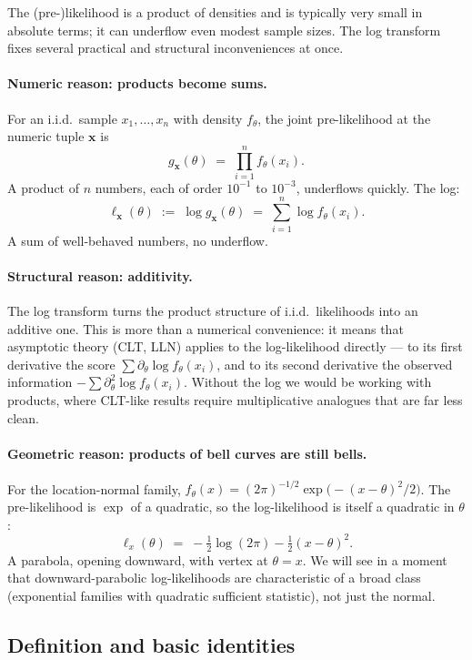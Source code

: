 \documentclass[a4paper,oneside,12pt]{extarticle}
\theoremstyle{plain}
\theoremstyle{definition}
\theoremstyle{remark}
\begin{document}
The (pre-)likelihood is a product of densities and is typically very
small in absolute terms; it can underflow even modest sample sizes.
The log transform fixes several practical and structural
inconveniences at once.

\paragraph{Numeric reason: products become sums.}
For an i.i.d.\ sample $x_1,\ldots,x_n$ with density $f_\theta$,
the joint pre-likelihood at the numeric tuple $\mathbf{x}$ is
\[
  g_{\mathbf{x}}(\theta) \;=\; \prod_{i=1}^n f_\theta(x_i).
\]
A product of $n$ numbers, each of order $10^{-1}$ to $10^{-3}$,
underflows quickly.  The log:
\[
  \ell_{\mathbf{x}}(\theta) \;:=\; \log g_{\mathbf{x}}(\theta)
  \;=\; \sum_{i=1}^n \log f_\theta(x_i).
\]
A sum of well-behaved numbers, no underflow.

\paragraph{Structural reason: additivity.}
The log transform turns the product structure of i.i.d.\ likelihoods
into an additive one.  This is more than a numerical convenience: it
means that asymptotic theory (CLT, LLN) applies to the log-likelihood
directly --- to its first derivative the score
$\sum \partial_\theta \log f_\theta(x_i)$, and to its second derivative
the observed information $-\sum \partial^2_\theta \log f_\theta(x_i)$.
Without the log we would be working with products, where CLT-like
results require multiplicative analogues that are far less clean.

\paragraph{Geometric reason: products of bell curves are still bells.}
For the location-normal family, $f_\theta(x) = (2\pi)^{-1/2}
\exp\!\bigl(-(x-\theta)^2/2\bigr)$.  The pre-likelihood is
$\exp$ of a quadratic, so the log-likelihood is itself a quadratic
in $\theta$:
\[
  \ell_x(\theta) \;=\; -\tfrac{1}{2}\log(2\pi) - \tfrac{1}{2}(x-\theta)^2.
\]
A parabola, opening downward, with vertex at $\theta = x$.  We will
see in a moment that downward-parabolic log-likelihoods are
characteristic of a broad class (exponential families with quadratic
sufficient statistic), not just the normal.

\subsection{Definition and basic identities}
\end{document}
